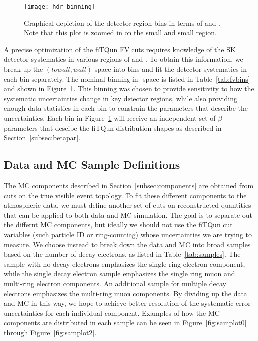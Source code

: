 \begin{figure}
  \label{fig:fvbin}
  \begin{center}
    \texttt{[image: hdr\_binning]}
  \end{center}
  \caption{Graphical depiction of the detector region bins in terms of \wall
  and \towall.  Note that this plot is zoomed in on the small \wall and small
  \towall region.}
\end{figure}

A precise optimization of the fiTQun FV cuts requires knowledge of the SK
detector systematics in various regions of \wall and \towall.  To obtain this
information, we break up the $(towall,wall)$ space into bins and fit the
detector systematics in each bin separately.  The nominal binning in
\wall-\towall space is listed in Table~\ref{tab:fvbins} and shown in
Figure~\ref{fig:fvbin}.  This binning was chosen to provide sensitivity to how
the systematic uncertainties change in key detector regions, while also
providing enough data statistics in each bin to constrain the parameters that
describe the uncertainties. Each bin in Figure~\ref{fig:fvbin} will receive an
independent set of $\beta$ parameters that descibe the fiTQun distribution
shapes as described in Section~\ref{subsec:betapar}.




\subsection{Data and MC Sample Definitions}
\label{subsec:samples}

The MC components described in Section~\ref{subsec:components} are obtained from
cuts on the true visible event topology.  To fit these different components to
the atmospheric data, we must define another set of cuts on reconstructed quantities
that can be applied to both data and MC simulation.  The goal is to 
separate out the differnt MC components, but ideally we should not
use the fiTQun cut variables (such particle ID or ring-counting) whose
uncertainties we are trying to measure.  We choose instead to break down the
data and MC into broad samples based on the number of decay electrons, as listed
in Table~\ref{tab:samples}.  The sample with no decay electrons emphasizes the
single ring electron component, while the single decay electron sample
emphasizes the single ring muon and multi-ring electron components. An
additional sample for multiple decay electrons emphasizes the multi-ring muon
components.  By dividing up the data and MC in this way, we hope to achieve better
resolution of the systematic error uncertainties for each individual component.
Examples of how the MC components are distributed in each sample can be seen in
Figure~\ref{fig:samplot0} through Figure~\ref{fig:samplot2}.

